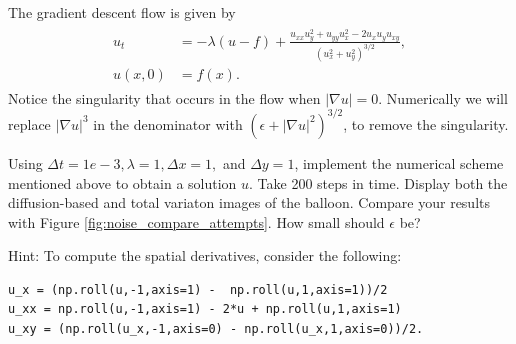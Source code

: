 The gradient descent flow is given by
\begin{align}
    \begin{split}
u_t &= -\lambda (u-f) + \frac{u_{xx}u_y^2 + u_{yy}u_x^2 - 2u_xu_yu_{xy}}{(u_x^2 + u_y^2)^{3/2}} ,\\
u(x,0) &= f(x).
\end{split} \label{tv_images:tv_flow}
\end{align}
Notice the singularity that occurs in the flow when $|\nabla u| = 0$. Numerically we will replace  $|\nabla u|^{3}$ in the denominator with $(\epsilon + |\nabla u|^{2})^{3/2}$, to remove the singularity.


\begin{problem}
Using $\Delta t = 1e-3, \lambda = 1, \Delta x = 1,$ and $ \Delta y = 1$, implement the numerical scheme mentioned above to obtain a solution $u$.  Take 200 steps in time. Display both the diffusion-based and total variaton images of the balloon. Compare your results with Figure \ref{fig:noise_compare_attempts}. How small should $\epsilon$ be?

Hint: To compute the spatial derivatives, consider the following:
\begin{lstlisting}
u_x = (np.roll(u,-1,axis=1) -  np.roll(u,1,axis=1))/2
u_xx = np.roll(u,-1,axis=1) - 2*u + np.roll(u,1,axis=1)
u_xy = (np.roll(u_x,-1,axis=0) - np.roll(u_x,1,axis=0))/2.
\end{lstlisting}
\end{problem}

